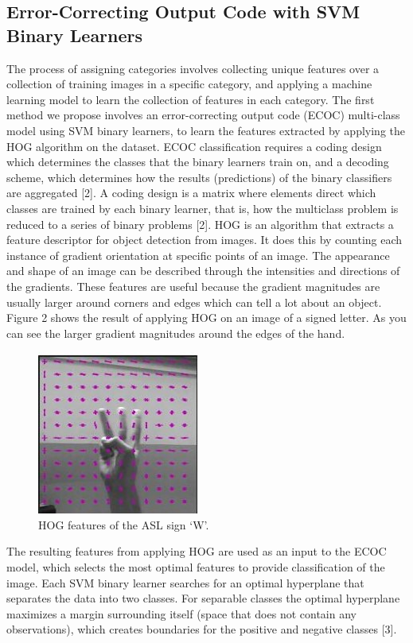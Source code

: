 \documentclass[conference]{IEEEtran}
\begin{document}
\subsection{Error-Correcting Output Code with SVM Binary Learners}
The process of assigning categories involves collecting unique features over a collection of training images in a specific category, and applying a machine learning model to learn the collection of features in each category. The first method we propose involves an error-correcting output code (ECOC) multi-class model using SVM binary learners, to learn the features extracted by applying the HOG algorithm on the dataset. ECOC classification requires a coding design which determines the classes that the binary learners train on, and a decoding scheme, which determines how the results (predictions) of the binary classifiers are aggregated [2]. A coding design is a matrix where elements direct which classes are trained by each binary learner, that is, how the multiclass problem is reduced to a series of binary problems [2]. HOG is an algorithm that extracts a feature descriptor for object detection from images. It does this by counting each instance of gradient orientation at specific points of an image. The appearance and shape of an image can be described through the intensities and directions of the gradients. These features are useful because the gradient magnitudes are usually larger around corners and edges which can tell a lot about an object. Figure 2 shows the result of applying HOG on an image of a signed letter. As you can see the larger gradient magnitudes around the edges of the hand. 
\begin{figure}[h]
\centering
\includegraphics[width=0.5\linewidth]{HOG_W_sign}
\caption{HOG features of the ASL sign `W'.}
\end{figure}
The resulting features from applying HOG are used as an input to the ECOC model, which selects the most optimal features to provide classification of the image. Each SVM binary learner searches for an optimal hyperplane that separates the data into two classes. For separable classes the optimal hyperplane maximizes a margin surrounding itself (space that does not contain any observations), which creates boundaries for the positive and negative classes [3]. 
\end{document}
